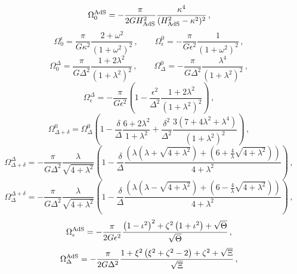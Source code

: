 \documentclass[11pt,a4paper]{article}
\begin{document}
\begin{equation}
\Omega_0^{\rm AdS} = - \frac{\pi}{2 G H_{\rm AdS}^{2}} \frac{\kappa^{4}}{(H_{\rm AdS}^{2} - \kappa^{2})^{2}} \,, \nonumber
\end{equation}
\begin{equation}
\Omega_0^\epsilon = \frac{\pi}{G \kappa^2} \frac{2 + \omega^2}{\left(1 + \omega^2\right)^2} \,, \qquad\Omega_{\epsilon}^0 = - \frac{\pi}{G \epsilon^2} \frac{1}{\left(1 + \omega^2\right)^2} \,, \nonumber
\end{equation}
\begin{equation}
\Omega_0^\Delta = \frac{\pi}{G \Delta^2} \frac{1 + 2 \lambda^2}{(1 + \lambda^2)^2} \,, \qquad \Omega_\Delta^0 = - \frac{\pi}{G \Delta^2} \frac{\lambda^4}{\left(1 + \lambda^2\right)^2} \,,  \nonumber
\end{equation}
\begin{equation}
\Omega_\epsilon^\Delta = - \frac{\pi}{G \epsilon^2} \left(1 - \frac{\epsilon^2}{\Delta^2} \frac{1 + 2 \lambda^2}{(1 + \lambda^2)^2}\right) \,, \nonumber
\end{equation}
\begin{equation}
\Omega_{\Delta + \delta}^0 = \Omega_\Delta^0 \left(1 - \frac{\delta}{\Delta} \frac{6 + 2 \lambda^2}{1 + \lambda^2} + \frac{\delta^2}{\Delta^2} \frac{3 (7 + 4 \lambda^2 + \lambda^4)}{(1+ \lambda^2)^2} \right) \,, \nonumber
\end{equation}
\begin{equation}
\Omega_{\Delta + \delta}^\Delta = - \frac{\pi}{G \Delta^2} \frac{\lambda}{\sqrt{4 + \lambda^2}} \left(1 - \frac{\delta}{\Delta} \frac{\left(\lambda (\lambda + \sqrt{4 + \lambda^2}) + \left(6 + \frac{4}{\lambda} \sqrt{4 + \lambda^2}\right)\right)}{4 + \lambda^2}\right) \,, \nonumber
\end{equation}
\begin{equation}
\Omega_\Delta^{\Delta + \delta} = - \frac{\pi}{G \Delta^2} \frac{\lambda}{\sqrt{4 + \lambda^2}} \left(1 - \frac{\delta}{\Delta} \frac{\left(\lambda (\lambda - \sqrt{4 + \lambda^2}) + \left(6 - \frac{4}{\lambda} \sqrt{4 + \lambda^2}\right)\right)}{4 + \lambda^2}\right) \,, \nonumber
\end{equation}
\begin{equation}
\Omega_{\epsilon}^{\rm AdS} = - \frac{\pi}{2 G \epsilon^2} \frac{\left(1 - \iota^2\right)^2 + \zeta^2 \left(1 + \iota^2\right) + \sqrt{\Theta}}{\sqrt{\Theta}} \,, \nonumber
\end{equation}
\begin{equation}
\Omega_{\Delta}^{\rm AdS} = - \frac{\pi}{2 G \Delta^2} \frac{1 + \xi^2 \left(\xi^2 + \zeta^2 - 2\right) + \zeta^2 + \sqrt{\Xi}}{\sqrt{\Xi}} \,, \nonumber
\end{equation}
\end{document}

